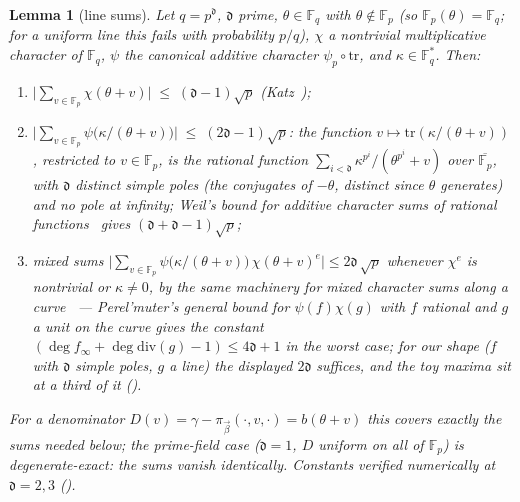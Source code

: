 \documentclass{article}
\newcommand{\Fp}{\mathbb{F}_p}
\newcommand{\Fq}{\mathbb{F}_q}
\newcommand{\extdeg}{\mathfrak{d}}
\newtheorem{lemma}[theorem]{Lemma}
\theoremstyle{definition}
\begin{document}
\begin{lemma}[line sums]\label{lem:linesums}
Let $q = p^{\extdeg}$, $\extdeg$ prime, $\theta \in \Fq$ with $\theta \notin \Fp$ (so $\Fp(\theta) = \Fq$; for a uniform line this fails with probability $p/q$), $\chi$ a nontrivial multiplicative character of $\Fq$, $\psi$ the canonical additive character $\psi_p \circ \mathrm{tr}$, and $\kappa \in \Fq^*$. Then:
\begin{enumerate}
    \item $\big|\sum_{v \in \Fp} \chi(\theta + v)\big| \;\leq\; (\extdeg - 1)\sqrt{p}$ \quad (Katz~\cite{katz_estimate});
    \item $\big|\sum_{v \in \Fp} \psi\big(\kappa/(\theta + v)\big)\big| \;\leq\; (2\extdeg - 1)\sqrt{p}$: the function $v \mapsto \mathrm{tr}(\kappa/(\theta+v))$, restricted to $v \in \Fp$, is the rational function $\sum_{i < \extdeg} \kappa^{p^i}/(\theta^{p^i} + v)$ over $\overline{\Fp}$, with $\extdeg$ distinct simple poles (the conjugates of $-\theta$, distinct since $\theta$ generates) and no pole at infinity; Weil's bound for additive character sums of rational functions~\cite{weil_sums,perelmuter} gives $(\extdeg + \extdeg - 1)\sqrt p$;
    \item mixed sums $\big|\sum_{v \in \Fp} \psi\big(\kappa/(\theta+v)\big)\, \chi(\theta + v)^{e}\big| \leq 2\extdeg\, \sqrt p$ whenever $\chi^e$ is nontrivial or $\kappa \neq 0$, by the same machinery for mixed character sums along a curve~\cite{perelmuter} --- Perel'muter's general bound for $\psi(f)\chi(g)$ with $f$ rational and $g$ a unit on the curve gives the constant $(\deg f_\infty + \deg \mathrm{div}(g) - 1) \leq 4\extdeg + 1$ in the worst case; for our shape ($f$ with $\extdeg$ simple poles, $g$ a line) the displayed $2\extdeg$ suffices, and the toy maxima sit at a third of it ().
\end{enumerate}
For a denominator $D(v) = \gamma - \pi_{\vec\beta}(\cdot, v, \cdot) = b(\theta + v)$ this covers exactly the sums needed below; the prime-field case ($\extdeg = 1$, $D$ uniform on all of $\Fp$) is degenerate-exact: the sums vanish identically. Constants verified numerically at $\extdeg = 2, 3$ ().
\end{lemma}
\end{document}
